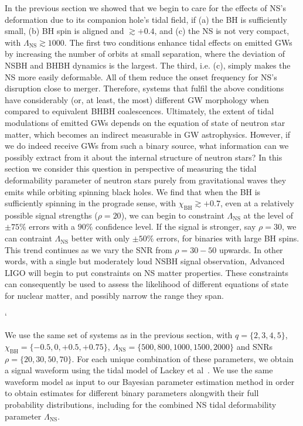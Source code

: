 \documentclass[aps,prd,amsmath,floats,floatfix, twocolumn,
superscriptaddress,nofootinbib,showpacs]{revtex4-1}
\newcommand{\lambdans}{\Lambda_\mathrm{NS}}
\newcommand{\chibh}{\chi_\mathrm{BH}}
\begin{document}
In the previous section we showed that we begin to care for the effects of NS's
deformation due to its companion hole's tidal field, if (a) the BH is sufficiently
small, (b) BH spin is aligned and $\gtrsim +0.4$, and (c) the NS is
not very compact, with $\lambdans\gtrsim 1000$. The first two conditions
enhance tidal effects on emitted GWs by increasing the number of orbits at small
separation, where the deviation of NSBH and BHBH dynamics is the largest. The third,
i.e. (c), simply makes the NS more easily deformable. All of them reduce the onset 
frequency for NS's disruption close to merger. Therefore, systems that fulfil the 
above conditions have considerably (or, at least, the most) different GW morphology
when compared to equivalent BHBH coalescences. Ultimately, the extent of 
tidal modulations of emitted GWs depends on the equation of state of neutron star
matter, which becomes an indirect measurable in GW astrophysics.
% 
However, if we do indeed receive GWs from such a binary source, what information can we
possibly extract from it about the internal structure of neutron stars?
In this section we consider this question in perspective of measuring the tidal 
deformability parameter of neutron stars purely from gravitational waves they emits 
while orbiting spinning black holes.
% 
We find that when the BH is sufficiently spinning in the prograde sense,
with $\chibh\gtrsim +0.7$, even at a relatively possible signal strengths ($\rho=20$),
we can begin to constraint $\lambdans$ at the level of $\pm 75\%$ errors with a $90\%$
confidence level. If the signal is stronger, say $\rho=30$, we can contraint
$\lambdans$ better with only $\pm 50\%$ errors, for binaries with large BH spins.
This trend continues as we vary the SNR from $\rho=30-50$ upwards. In other words,
with a single but moderately loud NSBH signal observation, Advanced LIGO will begin
to put constraints on NS matter properties. These constraints can consequently
be used to assess the likelihood of different equations of state for nuclear
matter, and possibly narrow the range they span.

  `

We use the same set of systems as in the previous section, with $q=\{2,3,4,5\}$,
$\chibh=\{-0.5,0,+0.5,+0.75\}$, $\lambdans=\{500, 800, 1000, 1500, 2000\}$ and SNRs
$\rho=\{20,30,50,70\}$. For each unique combination of these parameters, we obtain a
signal waveform using the tidal model of Lackey et al~\cite{Lackey:2013axa}.
We use the same waveform model as input to our Bayesian parameter estimation
method in order to obtain estimates for different binary parameters alongwith 
their full probability distributions, including for the combined NS tidal
deformability parameter $\lambdans$.
\end{document}
